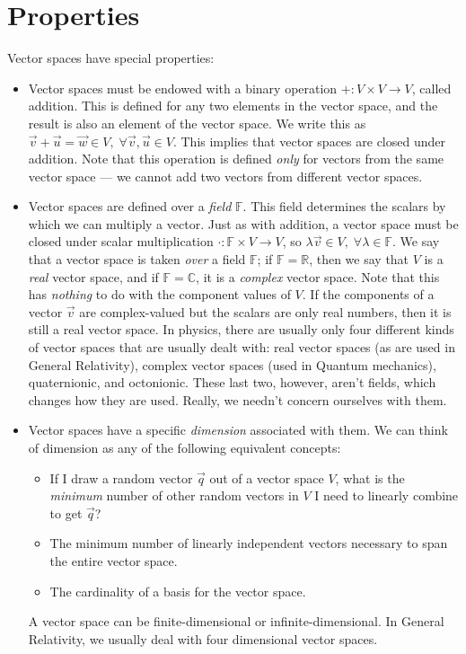 \section{Properties}
Vector spaces have special properties:
\begin{itemize}
    \item Vector spaces must be endowed with a binary operation $+ : V \times V \to V$, called addition.
    This is defined for any two elements in the vector space, and the result is also an element of the vector space.
    We write this as $\vec{v} + \vec{u} = \vec{w} \in V,\;\forall \vec{v},\vec{u} \in V$.
    This implies that vector spaces are closed under addition.
    Note that this operation is defined \emph{only} for vectors from the same vector space --- we cannot add two vectors from different vector spaces.
    \item Vector spaces are defined over a \emph{field} $\mathbb{F}$.
    This field determines the scalars by which we can multiply a vector. Just as with addition, a vector space must be closed under scalar multiplication $\cdot : \mathbb{F} \times V \to V$, so $\lambda\vec{v} \in V,\;\forall \lambda \in \mathbb{F}$.
    We say that a vector space is taken \emph{over} a field $\mathbb{F}$; if $\mathbb{F} = \mathbb{R}$, then we say that $V$ is a \emph{real} vector space, and if $\mathbb{F} = \mathbb{C}$, it is a \emph{complex} vector space. Note that this has \emph{nothing} to do with the component values of $V$.
    If the components of a vector $\vec{v}$ are complex-valued but the scalars are only real numbers, then it is still a real vector space.
    In physics, there are usually only four different kinds of vector spaces that are usually dealt with: real vector spaces (as are used in General Relativity), complex vector spaces (used in Quantum mechanics), quaternionic, and octonionic.
    These last two, however, aren't fields, which changes how they are used. Really, we needn't concern ourselves with them.
    \item Vector spaces have a specific \emph{dimension} associated with them. We can think of dimension as any of the following equivalent concepts:
        \begin{itemize}
            \item If I draw a random vector $\vec{q}$ out of a vector space $V$, what is the \emph{minimum} number of other random vectors in $V$ I need to linearly combine to get $\vec{q}$?
            \item The minimum number of linearly independent vectors necessary to span the entire vector space.
            \item The cardinality of a basis for the vector space.
        \end{itemize}
    A vector space can be finite-dimensional or infinite-dimensional. In General Relativity, we usually deal with four dimensional vector spaces.
\end{itemize}

